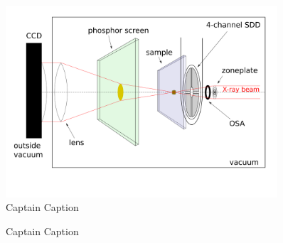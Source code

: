 



\begin{figure}[H] %
  \centering
     \includegraphics[width=0.9\textwidth]{illustrations/animax-gruppe_hanna.png}
  \caption[Captain Caption]{Captain Caption\cite[S.~40]{hanna}}
  \label{fig:animaxsetup}
\end{figure}




\begin{figure}[H]
\centering
\def\svgwidth{\textwidth}

  \caption[Captain Caption]{Captain Caption\cite[S.~43]{hanna}}
  \label{fig:quaddetektor}
\end{figure}
